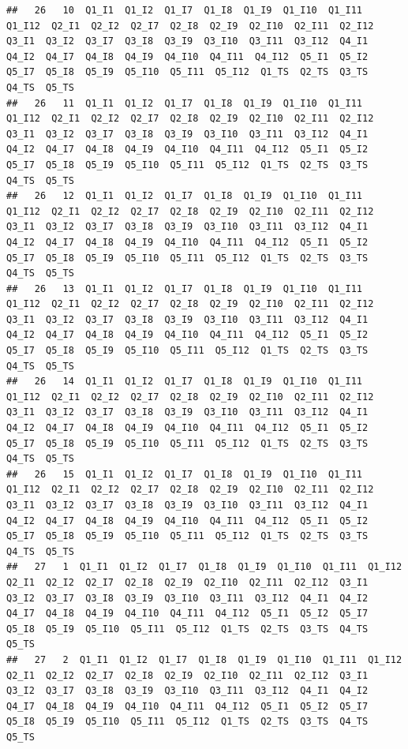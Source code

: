 \documentclass[
]{book}
\begin{document}
\begin{verbatim}
##   26   10  Q1_I1  Q1_I2  Q1_I7  Q1_I8  Q1_I9  Q1_I10  Q1_I11  Q1_I12  Q2_I1  Q2_I2  Q2_I7  Q2_I8  Q2_I9  Q2_I10  Q2_I11  Q2_I12  Q3_I1  Q3_I2  Q3_I7  Q3_I8  Q3_I9  Q3_I10  Q3_I11  Q3_I12  Q4_I1  Q4_I2  Q4_I7  Q4_I8  Q4_I9  Q4_I10  Q4_I11  Q4_I12  Q5_I1  Q5_I2  Q5_I7  Q5_I8  Q5_I9  Q5_I10  Q5_I11  Q5_I12  Q1_TS  Q2_TS  Q3_TS  Q4_TS  Q5_TS
##   26   11  Q1_I1  Q1_I2  Q1_I7  Q1_I8  Q1_I9  Q1_I10  Q1_I11  Q1_I12  Q2_I1  Q2_I2  Q2_I7  Q2_I8  Q2_I9  Q2_I10  Q2_I11  Q2_I12  Q3_I1  Q3_I2  Q3_I7  Q3_I8  Q3_I9  Q3_I10  Q3_I11  Q3_I12  Q4_I1  Q4_I2  Q4_I7  Q4_I8  Q4_I9  Q4_I10  Q4_I11  Q4_I12  Q5_I1  Q5_I2  Q5_I7  Q5_I8  Q5_I9  Q5_I10  Q5_I11  Q5_I12  Q1_TS  Q2_TS  Q3_TS  Q4_TS  Q5_TS
##   26   12  Q1_I1  Q1_I2  Q1_I7  Q1_I8  Q1_I9  Q1_I10  Q1_I11  Q1_I12  Q2_I1  Q2_I2  Q2_I7  Q2_I8  Q2_I9  Q2_I10  Q2_I11  Q2_I12  Q3_I1  Q3_I2  Q3_I7  Q3_I8  Q3_I9  Q3_I10  Q3_I11  Q3_I12  Q4_I1  Q4_I2  Q4_I7  Q4_I8  Q4_I9  Q4_I10  Q4_I11  Q4_I12  Q5_I1  Q5_I2  Q5_I7  Q5_I8  Q5_I9  Q5_I10  Q5_I11  Q5_I12  Q1_TS  Q2_TS  Q3_TS  Q4_TS  Q5_TS
##   26   13  Q1_I1  Q1_I2  Q1_I7  Q1_I8  Q1_I9  Q1_I10  Q1_I11  Q1_I12  Q2_I1  Q2_I2  Q2_I7  Q2_I8  Q2_I9  Q2_I10  Q2_I11  Q2_I12  Q3_I1  Q3_I2  Q3_I7  Q3_I8  Q3_I9  Q3_I10  Q3_I11  Q3_I12  Q4_I1  Q4_I2  Q4_I7  Q4_I8  Q4_I9  Q4_I10  Q4_I11  Q4_I12  Q5_I1  Q5_I2  Q5_I7  Q5_I8  Q5_I9  Q5_I10  Q5_I11  Q5_I12  Q1_TS  Q2_TS  Q3_TS  Q4_TS  Q5_TS
##   26   14  Q1_I1  Q1_I2  Q1_I7  Q1_I8  Q1_I9  Q1_I10  Q1_I11  Q1_I12  Q2_I1  Q2_I2  Q2_I7  Q2_I8  Q2_I9  Q2_I10  Q2_I11  Q2_I12  Q3_I1  Q3_I2  Q3_I7  Q3_I8  Q3_I9  Q3_I10  Q3_I11  Q3_I12  Q4_I1  Q4_I2  Q4_I7  Q4_I8  Q4_I9  Q4_I10  Q4_I11  Q4_I12  Q5_I1  Q5_I2  Q5_I7  Q5_I8  Q5_I9  Q5_I10  Q5_I11  Q5_I12  Q1_TS  Q2_TS  Q3_TS  Q4_TS  Q5_TS
##   26   15  Q1_I1  Q1_I2  Q1_I7  Q1_I8  Q1_I9  Q1_I10  Q1_I11  Q1_I12  Q2_I1  Q2_I2  Q2_I7  Q2_I8  Q2_I9  Q2_I10  Q2_I11  Q2_I12  Q3_I1  Q3_I2  Q3_I7  Q3_I8  Q3_I9  Q3_I10  Q3_I11  Q3_I12  Q4_I1  Q4_I2  Q4_I7  Q4_I8  Q4_I9  Q4_I10  Q4_I11  Q4_I12  Q5_I1  Q5_I2  Q5_I7  Q5_I8  Q5_I9  Q5_I10  Q5_I11  Q5_I12  Q1_TS  Q2_TS  Q3_TS  Q4_TS  Q5_TS
##   27   1  Q1_I1  Q1_I2  Q1_I7  Q1_I8  Q1_I9  Q1_I10  Q1_I11  Q1_I12  Q2_I1  Q2_I2  Q2_I7  Q2_I8  Q2_I9  Q2_I10  Q2_I11  Q2_I12  Q3_I1  Q3_I2  Q3_I7  Q3_I8  Q3_I9  Q3_I10  Q3_I11  Q3_I12  Q4_I1  Q4_I2  Q4_I7  Q4_I8  Q4_I9  Q4_I10  Q4_I11  Q4_I12  Q5_I1  Q5_I2  Q5_I7  Q5_I8  Q5_I9  Q5_I10  Q5_I11  Q5_I12  Q1_TS  Q2_TS  Q3_TS  Q4_TS  Q5_TS
##   27   2  Q1_I1  Q1_I2  Q1_I7  Q1_I8  Q1_I9  Q1_I10  Q1_I11  Q1_I12  Q2_I1  Q2_I2  Q2_I7  Q2_I8  Q2_I9  Q2_I10  Q2_I11  Q2_I12  Q3_I1  Q3_I2  Q3_I7  Q3_I8  Q3_I9  Q3_I10  Q3_I11  Q3_I12  Q4_I1  Q4_I2  Q4_I7  Q4_I8  Q4_I9  Q4_I10  Q4_I11  Q4_I12  Q5_I1  Q5_I2  Q5_I7  Q5_I8  Q5_I9  Q5_I10  Q5_I11  Q5_I12  Q1_TS  Q2_TS  Q3_TS  Q4_TS  Q5_TS

\end{verbatim}
\end{document}
